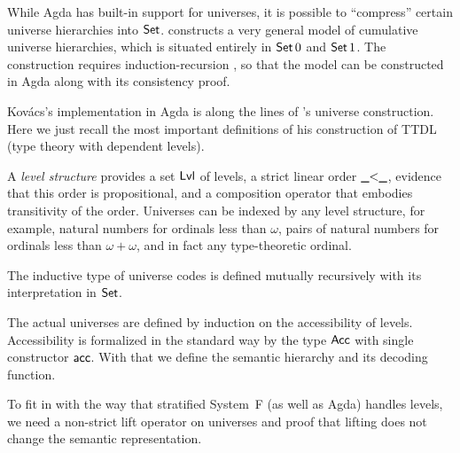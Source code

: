 \documentclass[manuscript,screen,review,anonymous]{acmart}
\begin{document}
While Agda has built-in support for universes, it is possible to
``compress'' certain universe hierarchies into
$\ASet$. \citet{DBLP:conf/csl/Kovacs22} constructs a very general model
of cumulative universe hierarchies, which is situated entirely in $\ASeti{0}$
and $\ASeti{1}$. The construction requires induction-recursion
\cite{DBLP:conf/tlca/DybjerS99}, so that the model can be constructed
in Agda along with its consistency proof.

Kov\'{a}cs's implementation in Agda is along the lines of
\citet{mcbride15:_datat_datat}'s universe construction. Here we just
recall the most important definitions of his construction of TTDL
(type theory with dependent levels).

A \emph{level structure} provides a set $\AgdaField{Lvl}$ of levels, a strict
linear order $\AgdaField{\_<\_}$, evidence that this order is propositional, and a
composition operator that embodies transitivity of the
order. Universes can be indexed by any level structure, for example,
natural numbers for ordinals less than $\omega$, pairs of natural
numbers for ordinals less than $\omega+\omega$, and in fact any
type-theoretic ordinal.

\ULvlStruct

The inductive type  of universe codes is defined mutually
recursively with its interpretation  in $\ASet$.

\begin{minipage}{0.45\linewidth}
\UUirSpec
\UUir  
\end{minipage}
\begin{minipage}{0.45\linewidth}
\UElirSpec
\UElir
\end{minipage}

The actual universes are defined by induction on the accessibility of
levels. Accessibility is formalized in the standard way by the type
$\AAcc$ with single constructor $\Aacc$.
\UUless
With that we define the semantic hierarchy and its decoding function.

\begin{minipage}{0.45\linewidth}
  \UU
\end{minipage}
\begin{minipage}{0.45\linewidth}
  \UEl
\end{minipage}

To fit in with the way that stratified System~F (as well as Agda)
handles levels, we need a non-strict lift operator on universes and
proof that lifting does not change the semantic representation.
\end{document}

